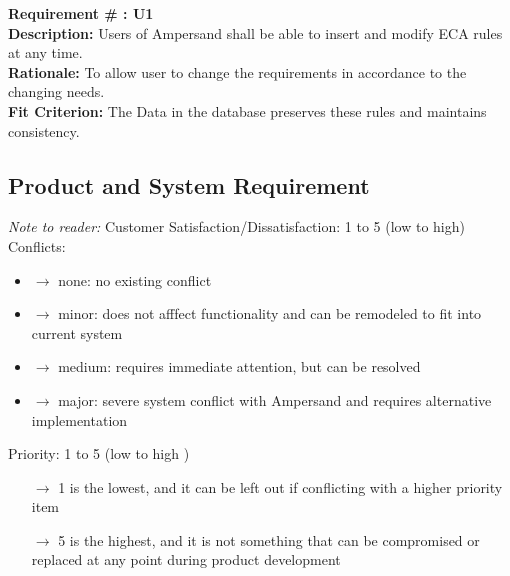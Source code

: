 \documentclass[12pt]{report}
\begin{document}
\textbf{Requirement \# : U1}
 \\
  \textbf{Description:} Users of Ampersand shall be able to insert and 
modify ECA rules at any time. \\
  \textbf{Rationale:} To allow user to change the requirements in accordance to the changing needs. \\
  \textbf{Fit Criterion:} The Data in the database preserves these rules and maintains consistency. 
  \\ \newline

\subsection{Product and System Requirement}
\textit{Note to reader:}\newline
Customer Satisfaction/Dissatisfaction: 1 to 5 (low to high) \newline
Conflicts: 
	\begin {itemize} 
	\item[$\rightarrow$] none: no existing conflict
	\item[$\rightarrow$] minor: does not afffect functionality and can be remodeled to fit into 
	current system 
	\item[$\rightarrow$] medium: requires immediate attention, but can be resolved
	\item[$\rightarrow$] major: severe system conflict with Ampersand and requires alternative 
	implementation
	\end{itemize} 
Priority: 1 to 5 \big(low to high \big)
	\begin{itemize}
	\item[$\rightarrow$] 1 is the lowest, and it can be left out if conflicting with a higher 
	priority 
	item
	\item[$\rightarrow$] 5 is the highest, and it is not something that can be compromised or 
	replaced at any point during product development
	\end{itemize}
\end{document}
